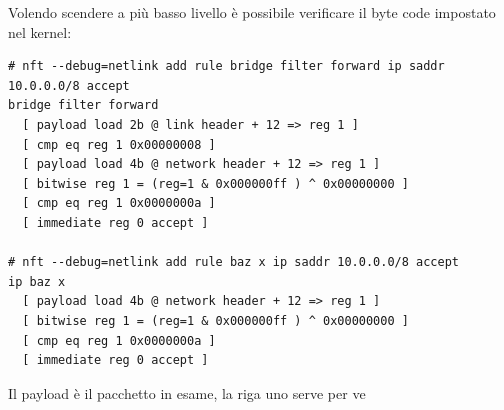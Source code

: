 Volendo scendere a pi\`u basso livello \`e possibile verificare il byte code
impostato nel kernel:
\begin{lstlisting}[style=customb]
# nft --debug=netlink add rule bridge filter forward ip saddr 10.0.0.0/8 accept
bridge filter forward 
  [ payload load 2b @ link header + 12 => reg 1 ]
  [ cmp eq reg 1 0x00000008 ]
  [ payload load 4b @ network header + 12 => reg 1 ]
  [ bitwise reg 1 = (reg=1 & 0x000000ff ) ^ 0x00000000 ]
  [ cmp eq reg 1 0x0000000a ]
  [ immediate reg 0 accept ]

# nft --debug=netlink add rule baz x ip saddr 10.0.0.0/8 accept            
ip baz x 
  [ payload load 4b @ network header + 12 => reg 1 ]
  [ bitwise reg 1 = (reg=1 & 0x000000ff ) ^ 0x00000000 ]
  [ cmp eq reg 1 0x0000000a ]
  [ immediate reg 0 accept ]
\end{lstlisting}
Il payload \`e il pacchetto in esame, la riga uno serve per ve
